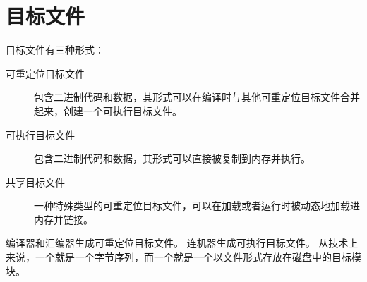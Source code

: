 
\section{目标文件}
{
    目标文件有三种形式：

    \begin{description}
        \item[可重定位目标文件] 包含二进制代码和数据，其形式可以在编译时与其他可重定位目标文件合并起来，创建一个可执行目标文件。
        \item[可执行目标文件] 包含二进制代码和数据，其形式可以直接被复制到内存并执行。
        \item[共享目标文件] 一种特殊类型的可重定位目标文件，可以在加载或者运行时被动态地加载进内存并链接。
    \end{description}

    编译器和汇编器生成可重定位目标文件。
    连机器生成可执行目标文件。
    从技术上来说，一个就是一个字节序列，而一个就是一个以文件形式存放在磁盘中的目标模块。
}
